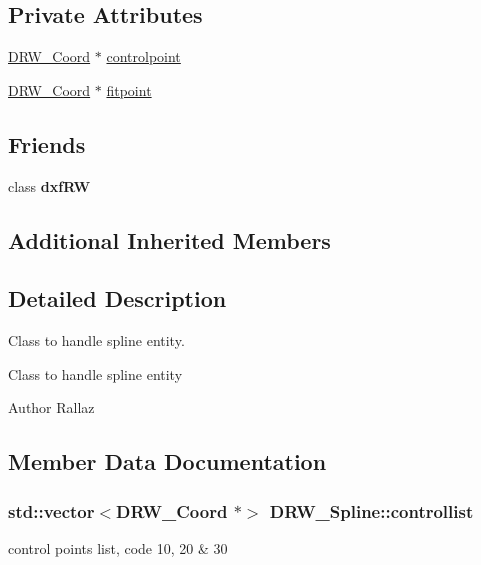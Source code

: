 \subsection*{Private Attributes}
\begin{DoxyCompactItemize}
\item 
\hyperlink{class_d_r_w___coord}{D\+R\+W\+\_\+\+Coord} $\ast$ \hyperlink{class_d_r_w___spline_a651189169a59868278d298a9e954d093}{controlpoint}
\item 
\hyperlink{class_d_r_w___coord}{D\+R\+W\+\_\+\+Coord} $\ast$ \hyperlink{class_d_r_w___spline_a63415bb4da307f0355bbbbac50a7bc47}{fitpoint}
\end{DoxyCompactItemize}
\subsection*{Friends}
\begin{DoxyCompactItemize}
\item 
\hypertarget{class_d_r_w___spline_a7f080e77e5112f8364c61b97387f8ee2}{}class {\bfseries dxf\+R\+W}\label{class_d_r_w___spline_a7f080e77e5112f8364c61b97387f8ee2}

\end{DoxyCompactItemize}
\subsection*{Additional Inherited Members}


\subsection{Detailed Description}
Class to handle spline entity. 

Class to handle spline entity \begin{DoxyAuthor}{Author}
Rallaz 
\end{DoxyAuthor}


\subsection{Member Data Documentation}
\hypertarget{class_d_r_w___spline_a37b5e6ce7e32c1577fed59c3704c0e0f}{}
\subsubsection[{controllist}]{\setlength{\rightskip}{0pt plus 5cm}std\+::vector$<${\bf D\+R\+W\+\_\+\+Coord} $\ast$$>$ D\+R\+W\+\_\+\+Spline\+::controllist}\label{class_d_r_w___spline_a37b5e6ce7e32c1577fed59c3704c0e0f}
control points list, code 10, 20 \& 30 \hypertarget{class_d_r_w___spline_a651189169a59868278d298a9e954d093}{}
